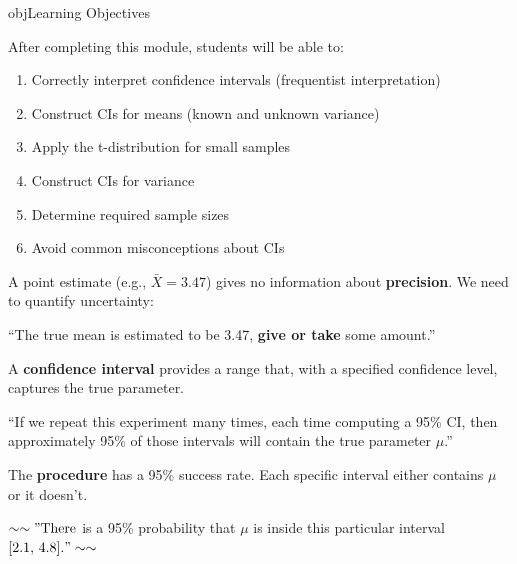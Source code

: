 \begin{PSbox}[unbreakable]{obj}{Learning Objectives}

After completing this module, students will be able to:

\begin{enumerate}
\def\labelenumi{\arabic{enumi}.}
\tightlist
\item
  Correctly interpret confidence intervals (frequentist interpretation)
\item
  Construct CIs for means (known and unknown variance)
\item
  Apply the t-distribution for small samples
\item
  Construct CIs for variance
\item
  Determine required sample sizes
\item
  Avoid common misconceptions about CIs
\end{enumerate}

\end{PSbox}


A point estimate (e.g., $\bar{X} = 3.47$) gives no information about \textbf{precision}. We need to quantify uncertainty:

``The true mean is estimated to be 3.47, \textbf{give or take} some amount.''

A \textbf{confidence interval} provides a range that, with a specified confidence level, captures the true parameter.



\begin{PSquote}

``If we repeat this experiment many times, each time computing a 95\% CI, then approximately 95\% of those intervals will contain the true parameter $\mu$.''

\end{PSquote}

The \textbf{procedure} has a 95\% success rate. Each specific interval either contains $\mu$ or it doesn’t.


\begin{PSquote}

$\sim \sim "\mathrm{There}$ is a 95\% probability that $\mu$ is inside this particular interval $[2.1,\, 4.8]." \sim \sim$

\end{PSquote}

